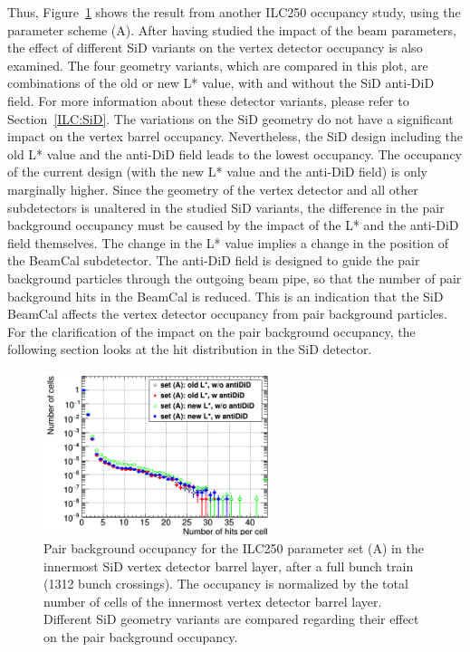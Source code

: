 Thus, Figure~\ref{fig:PairBkg:ILC250_Occupancy_SetA} shows the result from another ILC250 occupancy study, using the parameter scheme (A).
After having studied the impact of the beam parameters, the effect of different SiD variants on the vertex detector occupancy is also examined.
The four geometry variants, which are compared in this plot, are combinations of the old or new L* value, with and without the SiD anti-DiD field.
For more information about these detector variants, please refer to Section~\ref{ILC:SiD}.
The variations on the SiD geometry do not have a significant impact on the vertex barrel occupancy.
Nevertheless, the SiD design including the old L* value and the anti-DiD field leads to the lowest occupancy.
The occupancy of the current design (with the new L* value and the anti-DiD field) is only marginally higher.
Since the geometry of the vertex detector and all other subdetectors is unaltered in the studied SiD variants, the difference in the pair background occupancy must be caused by the impact of the L* and the anti-DiD field themselves.
The change in the L* value implies a change in the position of the BeamCal subdetector.
The anti-DiD field is designed to guide the pair background particles through the outgoing beam pipe, so that the number of pair background hits in the BeamCal is reduced.
This is an indication that the SiD BeamCal affects the vertex detector occupancy from pair background particles.
For the clarification of the impact on the pair background occupancy, the following section looks at the hit distribution in the SiD detector.
 \begin{figure}
 \centering
    \includegraphics[width=0.6\textwidth]{Figures/Pairs/Occupancy_Comparison_Layer_0_numcells_ILC250_Comparison_Set_A_All_SiD_designs_LEG.png}
   \caption[Pair background occupancy in the \sid vertex detector for the ILC250 set (A) for different \sid geometry variants]{Pair background occupancy for the ILC250 parameter set (A) in the innermost SiD vertex detector barrel layer, after a full bunch train (1312 bunch crossings).
   The occupancy is normalized by the total number of cells of the innermost vertex detector barrel layer.
   Different SiD geometry variants are compared regarding their effect on the pair background occupancy.
   }
   \label{fig:PairBkg:ILC250_Occupancy_SetA}
 \end{figure}

